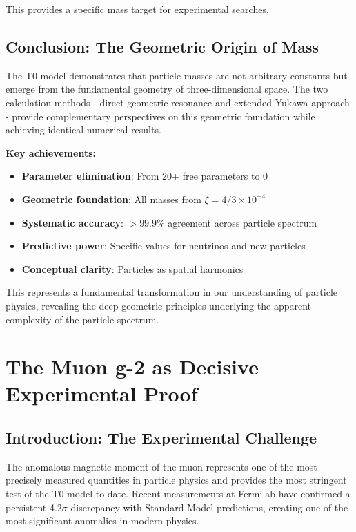 \documentclass[12pt,a4paper]{report}
\begin{document}
This provides a specific mass target for experimental searches.

\section{Conclusion: The Geometric Origin of Mass}
\label{sec:conclusion_geometric_mass}

The T0 model demonstrates that particle masses are not arbitrary constants but emerge from the fundamental geometry of three-dimensional space. The two calculation methods - direct geometric resonance and extended Yukawa approach - provide complementary perspectives on this geometric foundation while achieving identical numerical results.

\textbf{Key achievements:}

\begin{itemize}
	\item \textbf{Parameter elimination}: From 20+ free parameters to 0
	\item \textbf{Geometric foundation}: All masses from $\xi = 4/3 \times 10^{-4}$
	\item \textbf{Systematic accuracy}: $> 99.9\%$ agreement across particle spectrum
	\item \textbf{Predictive power}: Specific values for neutrinos and new particles
	\item \textbf{Conceptual clarity}: Particles as spatial harmonics
\end{itemize}

This represents a fundamental transformation in our understanding of particle physics, revealing the deep geometric principles underlying the apparent complexity of the particle spectrum.	
	\chapter{The Muon g-2 as Decisive Experimental Proof}
	\label{chap:muon_g2}
	
	\section{Introduction: The Experimental Challenge}
	\label{sec:muon_g2_introduction}
	
	The anomalous magnetic moment of the muon represents one of the most precisely measured quantities in particle physics and provides the most stringent test of the T0-model to date. Recent measurements at Fermilab have confirmed a persistent 4.2$\sigma$ discrepancy with Standard Model predictions, creating one of the most significant anomalies in modern physics.
	
\end{document}
